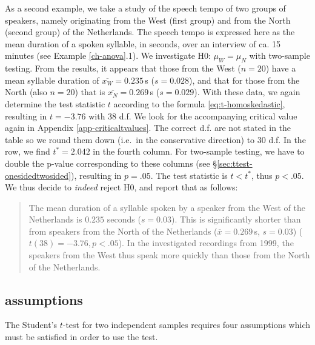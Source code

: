 \documentclass[
]{book}
\begin{document}
As a second example, we take a study of the speech tempo of two groups
of speakers, namely originating from the West (first group) and
from the North (second group) of the Netherlands. The speech tempo
is expressed here as the mean duration of a spoken syllable, in seconds,
over an interview of ca. 15 minutes (see Example \ref{ch-anova}.1).
We investigate H0: \(\mu_W = \mu_N\) with
two-sample testing. From the results, it appears that those from the West
(\(n=20\)) have a mean syllable duration of
\(\overline{x_W}=0.235\) s (\(s=0.028\)), and that for those from the North (also
\(n=20\)) that is \(\overline{x_N}=0.269\) s (\(s=0.029\)). With these data,
we again determine the test statistic \(t\) according to the formula
\eqref{eq:t-homoskedastic}, resulting in \(t=-3.76\) with 38 d.f. We look for
the accompanying critical value again in Appendix
\ref{app-criticaltvalues}. The correct d.f. are not stated in the table
so we round them down (i.e.~in the conservative direction) to
30 d.f. In the row, we find \(t^*=2.042\) in the fourth column.
For two-sample testing, we have to double the p-value corresponding to
these columns (see
§\ref{sec:ttest-onesidedtwosided}), resulting in \(p=.05\). The
test statistic is \(t < t^*\), thus \(p<.05\). We thus decide
to \emph{indeed} reject H0, and report that as follows:

\begin{quote}
The mean duration of a syllable spoken by a speaker from the West
of the Netherlands is \(0.235\) seconds (\(s=0.03\)). This is
significantly shorter than from speakers from the North of the Netherlands
(\(\overline{x}=0.269\) s, \(s=0.03\)) (\(t(38)=-3.76, p<.05\)). In the
investigated recordings from 1999, the speakers from the West thus
speak more quickly than those from the North of the Netherlands.
\end{quote}

\hypertarget{sec:ttest-unpaired-assumptions}{%
\subsection{assumptions}\label{sec:ttest-unpaired-assumptions}}

The Student's \(t\)-test for two independent samples requires four assumptions
which must be satisfied in order to use the test.
\end{document}
